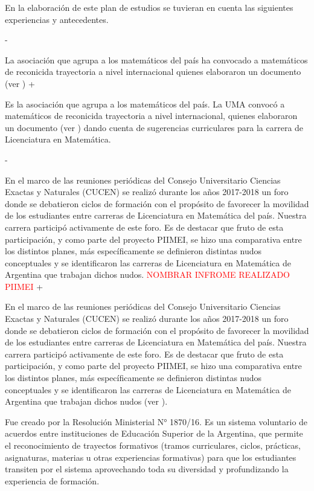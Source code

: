  En la elaboración de este plan de estudios se tuvieran en cuenta las siguientes experiencias y antecedentes.
 \begin{description}
- \item[Unión Matemática Argentina]  La asociación que agrupa a los matemáticos del país ha convocado a matemáticos de reconicida trayectoria a nivel internacional quienes elaboraron un documento (ver \cite{uma}) 
+ \item[Unión Matemática Argentina]  Es la asociación que agrupa a los matemáticos del país.  La UMA convocó a matemáticos de reconicida trayectoria a nivel internacional, quienes elaboraron un documento (ver \cite{uma}) 
  dando cuenta de sugerencias curriculares para la carrera de Licenciatura en Matemática.
  
- \item[Foro UMA-CUCEN] En el marco de las reuniones periódicas del Consejo Universitario Ciencias Exactas y Naturales (CUCEN) se realizó durante los años 2017-2018 un foro donde se debatieron ciclos de formación con el propósito de favorecer la movilidad de los estudiantes entre carreras de Licenciatura en Matemática del país. Nuestra carrera participó activamente de este foro. Es de destacar que fruto de esta participación, y como parte del proyecto PIIMEI, se hizo una comparativa entre los distintos planes, más específicamente se definieron distintas nudos conceptuales y se identificaron las carreras de Licenciatura en Matemática de Argentina que trabajan dichos nudos. \textcolor{red}{NOMBRAR INFROME REALIZADO PIIMEI}
+ \item[Foro UMA-CUCEN] En el marco de las reuniones periódicas del Consejo Universitario Ciencias Exactas y Naturales (CUCEN) se realizó durante los años 2017-2018 un foro donde se debatieron ciclos de formación con el propósito de favorecer la movilidad de los estudiantes entre carreras de Licenciatura en Matemática del país. Nuestra carrera participó activamente de este foro. Es de destacar que fruto de esta participación, y como parte del proyecto PIIMEI, se hizo una comparativa entre los distintos planes, más específicamente se definieron distintas nudos conceptuales y se identificaron las carreras de Licenciatura en Matemática de Argentina que trabajan dichos nudos (ver \cite{CCP}). 
 
 \item[Sistema Nacional de Reconocimiento Académico (SNRA)] Fue creado por la Resolución Ministerial N° 1870/16. Es un sistema voluntario de acuerdos entre instituciones de Educación Superior de la Argentina, que permite el reconocimiento de trayectos formativos (tramos curriculares, ciclos, prácticas, asignaturas, materias u otras experiencias formativas) para que los estudiantes transiten por el sistema aprovechando toda su diversidad y profundizando la experiencia de formación.
 

\end{description}
